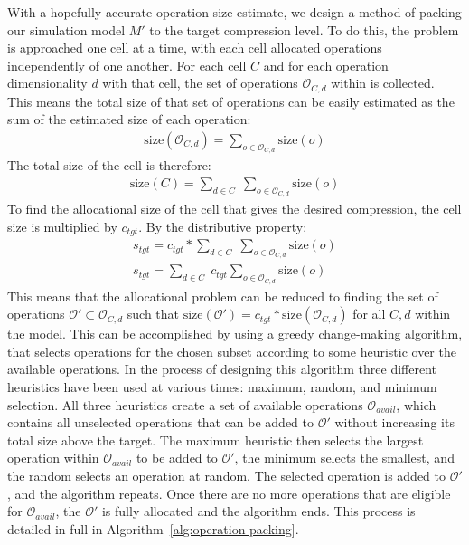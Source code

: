 With a hopefully accurate operation size estimate, we design a method of packing our simulation model
$M'$ to the target compression level. To do this, the problem is approached one cell at a time, with each cell allocated
operations independently of one another. For each cell $C$ and for each operation dimensionality $d$ with that cell,
the set of operations $\mathcal{O}_{C,d}$ within is collected. This means the total size of that set of operations can be easily
estimated as the sum of the estimated size of each operation:
\newcommand{\size}{\text{size}}
\begin{align}
	\size(\mathcal{O}_{C,d}) = \sum_{o \in \mathcal{O}_{C,d}}{\size(o)} \label{eq:additive sizing}
\end{align}
The total size of the cell is therefore:
\begin{align}
	\size(C) = \sum_{d \in C} \; \sum_{o \in \mathcal{O}_{C,d}}{\size(o)}
\end{align}
To find the allocational size of the cell that gives the desired compression, the cell size is multiplied by
$c_{tgt}$. By the distributive property:
\begin{align}
	s_{tgt} = c_{tgt} * \sum_{d \in C} \; \sum_{o \in \mathcal{O}_{C,d}}{\size(o)} \\
	s_{tgt} = \sum_{d \in C} \; c_{tgt} \sum_{o \in \mathcal{O}_{C,d}}{\size(o)}
\end{align}
This means that the allocational problem can be reduced to finding the set of operations
$\mathcal{O}' \subset \mathcal{O}_{C,d}$ such that $\size(\mathcal{O}')=c_{tgt} * \size(\mathcal{O}_{C,d})$ for all
$C, d$ within the model. This can be accomplished by using a greedy change-making algorithm, that selects operations for
the chosen subset according to some heuristic over the available operations. In the process of designing this algorithm
three different heuristics have been used at various times: maximum, random, and minimum selection.
All three heuristics create a set of available operations $\mathcal{O}_{avail}$, which contains all unselected operations
that can be added to $\mathcal{O}'$ without increasing its total size above the target. The maximum heuristic then selects
the largest operation within $\mathcal{O}_{avail}$ to be added to $\mathcal{O}'$, the minimum selects the smallest, and
the random selects an operation at random. The selected operation is added to $\mathcal{O}'$, and the algorithm repeats.
Once there are no more operations that are eligible for $\mathcal{O}_{avail}$, the $\mathcal{O}'$ is fully allocated and the
algorithm ends. This process is detailed in full in Algorithm~\ref{alg:operation packing}.

